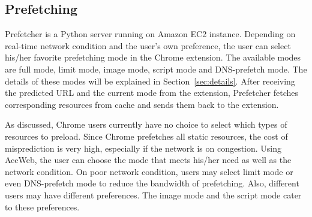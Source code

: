 \subsection{Prefetching}

Prefetcher is a Python server running on Amazon EC2 instance. Depending on real-time network condition and the user's own preference, the user can select his/her favorite prefetching mode in the Chrome extension. The available modes are full mode, limit mode, image mode, script mode and DNS-prefetch mode. The details of these modes will be explained in Section~\ref{sec:details}. After receiving the predicted URL and the current mode from the extension, Prefetcher fetches corresponding resources from cache and sends them back to the extension.

As discussed, Chrome users currently have no choice to select which types of resources to preload. Since Chrome prefetches all static resources, the cost of misprediction is very high, especially if the network is on congestion. Using AccWeb, the user can choose the mode that meets his/her need as well as the network condition. On poor network condition, users may select limit mode or even DNS-prefetch mode to reduce the bandwidth of prefetching. Also, different users may have different preferences. The image mode and the script mode cater to these preferences.